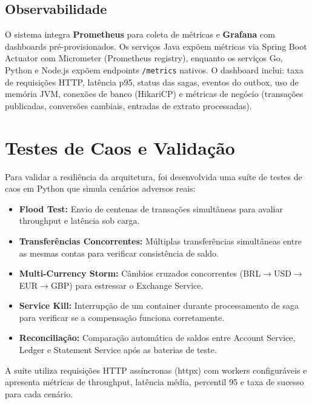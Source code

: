 \documentclass[12pt]{article}
\begin{document}
\subsection{Observabilidade}

O sistema integra \textbf{Prometheus} para coleta de m\'{e}tricas e \textbf{Grafana} com dashboards pr\'{e}-provisionados. Os servi\c{c}os Java exp\~{o}em m\'{e}tricas via Spring Boot Actuator com Micrometer (Prometheus registry), enquanto os servi\c{c}os Go, Python e Node.js exp\~{o}em endpoints \texttt{/metrics} nativos. O dashboard inclui: taxa de requisi\c{c}\~{o}es HTTP, lat\^{e}ncia p95, status das sagas, eventos do outbox, uso de mem\'{o}ria JVM, conex\~{o}es de banco (HikariCP) e m\'{e}tricas de neg\'{o}cio (transa\c{c}\~{o}es publicadas, convers\~{o}es cambiais, entradas de extrato processadas).

\section{Testes de Caos e Valida\c{c}\~{a}o}

Para validar a resili\^{e}ncia da arquitetura, foi desenvolvida uma su\'{i}te de testes de caos em Python que simula cen\'{a}rios adversos reais:

\begin{itemize}[noitemsep]
  \item \textbf{Flood Test:} Envio de centenas de transa\c{c}\~{o}es simult\^{a}neas para avaliar throughput e lat\^{e}ncia sob carga.
  \item \textbf{Transfer\^{e}ncias Concorrentes:} M\'{u}ltiplas transfer\^{e}ncias simult\^{a}neas entre as mesmas contas para verificar consist\^{e}ncia de saldo.
  \item \textbf{Multi-Currency Storm:} C\^{a}mbios cruzados concorrentes (BRL$\rightarrow$USD$\rightarrow$EUR$\rightarrow$GBP) para estressar o Exchange Service.
  \item \textbf{Service Kill:} Interrup\c{c}\~{a}o de um container durante processamento de saga para verificar se a compensa\c{c}\~{a}o funciona corretamente.
  \item \textbf{Reconcilia\c{c}\~{a}o:} Compara\c{c}\~{a}o autom\'{a}tica de saldos entre Account Service, Ledger e Statement Service ap\'{o}s as baterias de teste.
\end{itemize}

A su\'{i}te utiliza requisi\c{c}\~{o}es HTTP ass\'{i}ncronas (httpx) com workers configur\'{a}veis e apresenta m\'{e}tricas de throughput, lat\^{e}ncia m\'{e}dia, percentil 95 e taxa de sucesso para cada cen\'{a}rio.
\end{document}
